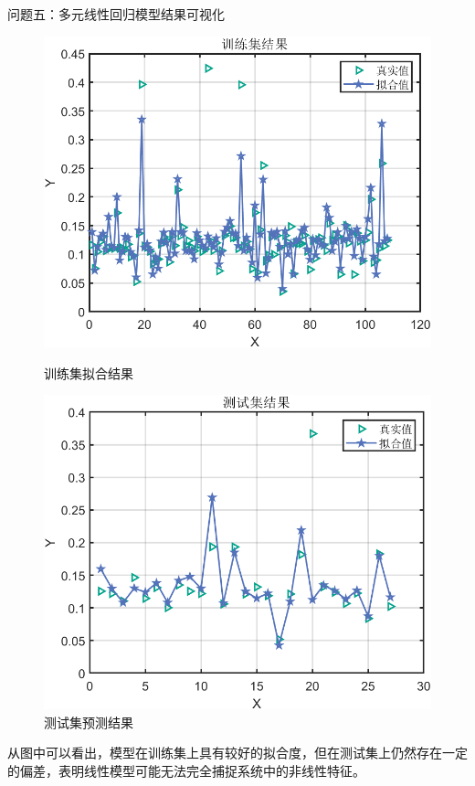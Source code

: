 \documentclass{beamer}
\begin{document}
\begin{frame}{问题五：多元线性回归模型结果可视化}
    \scriptsize
    \begin{figure}
        \centering
        \begin{minipage}[t]{0.45\linewidth}
            \centering
            \includegraphics[width=\linewidth]{pic/线性回归训练集.png}
            \caption{训练集拟合结果}
            \label{fig:train_fit}
        \end{minipage}%
        \hfill
        \begin{minipage}[t]{0.45\linewidth}
            \centering
            \includegraphics[width=\linewidth]{pic/线性回归测试集.png}
            \caption{测试集预测结果}
            \label{fig:test_prediction}
        \end{minipage}
    \end{figure}

    \vspace{0.2cm}
    
    从图中可以看出，模型在训练集上具有较好的拟合度，但在测试集上仍然存在一定的偏差，表明线性模型可能无法完全捕捉系统中的非线性特征。
\end{frame}
\end{document}
